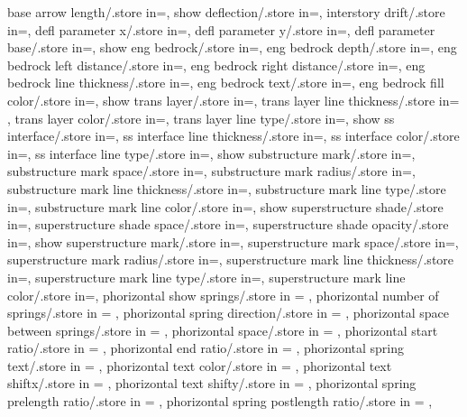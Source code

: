 {  base arrow length/.store in=\basearrlen,
  show deflection/.store in=\showdefl, 
  interstory drift/.store in=\drift,
  defl parameter x/.store in=,
  defl parameter y/.store in=,
  defl parameter base/.store in=,
  show eng bedrock/.store in=\showengbedrock,
  eng bedrock depth/.store in=\engbedrockdepth,
  eng bedrock left distance/.store in=\engbedrockleftdist,
  eng bedrock right distance/.store in=\engbedrockrightdist,
  eng bedrock line thickness/.store in=\engbedrocklinewidth,
  eng bedrock text/.store in=\engbedrocktext,
  eng bedrock fill color/.store in=\engbedrockfillcolor,
  show trans layer/.store in=\showtranslayer,
  trans layer line thickness/.store in= \translayerlinet,
  trans layer color/.store in=\translayercolor,
  trans layer line type/.store in=\translayerlinetype,
  show ss interface/.store in=\showssinter,
  ss interface line thickness/.store in=\ssinterlinet,
  ss interface color/.store in=\ssintercolor,
  ss interface line type/.store in=\ssinterlinetype,
  show substructure mark/.store in=\showmarkss,
  substructure mark space/.store in=\markssexspace,
  substructure mark radius/.store in=\markssrad,
  substructure mark line thickness/.store in=\marksslinet,
  substructure mark line type/.store in=\marksslinetype,
  substructure mark line color/.store in=\marksslinecolor,
  show superstructure shade/.store in=\showsupershade,
  superstructure shade space/.store in=\supershadespace,
  superstructure shade opacity/.store in=\supershadeopacity,
  show superstructure mark/.store in=\showmarksuper,
  superstructure mark space/.store in=\marksuperexspace,
  superstructure mark radius/.store in=\marksuperrad,
  superstructure mark line thickness/.store in=\marksuperlinet,
  superstructure mark line type/.store in=\marksuperlinetype,
  superstructure mark line color/.store in=\marksuperlinecolor,
  phorizontal show springs/.store in = \showphorizontalsprings,
  phorizontal number of springs/.store in = \phorspringnumber,
  phorizontal spring direction/.store in = \phorspringdir,
  phorizontal space between springs/.store in = \phorspbtwspr,
  phorizontal space/.store in = \phorspringspace,
  phorizontal start ratio/.store in = \phorspringstartratio,
  phorizontal end ratio/.store in = \phorspringendratio,
  phorizontal spring text/.store in = \phorspringtext,
  phorizontal text color/.store in = \phortextcolor,
  phorizontal text shiftx/.store in = \phortextshiftx,
  phorizontal text shifty/.store in = \phortextshifty,
  phorizontal spring prelength ratio/.store in = \phorprelenratio,
  phorizontal spring postlength ratio/.store in = \phorpostlenratio,
}
